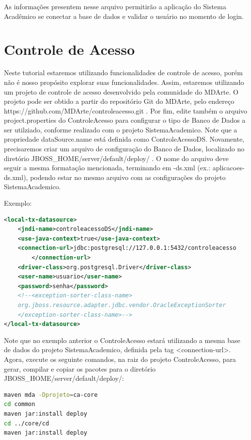 As informações presentem nesse arquivo permitirão a aplicação do Sistema Acadêmico se
conectar a base de dados e validar o usuário no momento de login.

\section{Controle de Acesso}

Neste tutorial estaremos utilizando funcionalidades de controle de acesso, porém não é
nosso propósito explorar suas funcionalidades. Assim, estaremos utilizando um projeto de controle
de acesso desenvolvido pela comunidade do MDArte.
O projeto pode ser obtido a partir do repositório Git do MDArte,
pelo endereço https://github.com/MDArte/controleacesso.git . Por fim, edite também o
arquivo project.properties do ControleAcesso para configurar o tipo de Banco de Dados a ser
utilziado, conforme realizado com o projeto SistemaAcademico. Note que a propriedade
dataSource.name está definida como ControleAcessoDS.
Novamente, precisaremos criar um arquivo de configuração do Banco de Dados, localizado
no diretório JBOSS\_HOME/server/default/deploy/ . O nome do arquivo deve seguir
a mesma formatação mencionada, terminando em -ds.xml (ex.: aplicacoes-ds.xml), podendo estar no mesmo
arquivo com as configurações do projeto SistemaAcademico.

Exemplo:

\begin{lstlisting}[language=xml]
<local-tx-datasource>
	<jndi-name>controleacessoDS</jndi-name>
	<use-java-context>true</use-java-context>
	<connection-url>jdbc:postgresql://127.0.0.1:5432/controleacesso
		</connection-url> 
	<driver-class>org.postgresql.Driver</driver-class>
	<user-name>usuario</user-name>
	<password>senha</password>
	<!--<exception-sorter-class-name>
	org.jboss.resource.adapter.jdbc.vendor.OracleExceptionSorter
	</exception-sorter-class-name>-->
</local-tx-datasource>
\end{lstlisting}

Note que no exemplo anterior o ControleAcesso estará utilizando a mesma base de dados
do projeto SistemaAcademico, definida pela tag <connection-url>. Agora, execute os seguinte
comandos, na raiz do projeto ControleAcesso, para gerar, compilar e copiar os pacotes para o
diretório JBOSS\_HOME/server/default/deploy/:

\begin{lstlisting}[language=bash]
maven mda -Dprojeto=ca-core
cd common
maven jar:install deploy
cd ../core/cd
maven jar:install deploy
\end{lstlisting}

